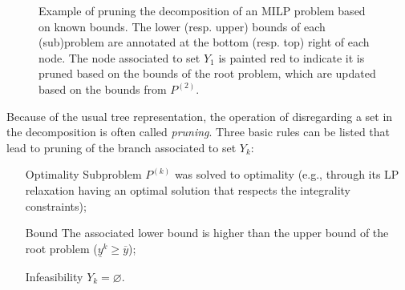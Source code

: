 \begin{figure}[h]
    \centering
    \caption{Example of pruning the decomposition of an MILP problem based on known bounds. The lower (resp. upper) bounds of each (sub)problem are annotated at the bottom (resp. top) right of each node. The node associated to set $Y_1$ is painted red to indicate it is pruned based on the bounds of the root problem, which are updated based on the bounds from $P^{(2)}$.}
    \label{fig:pruning-example-milp}
\end{figure}

Because of the usual tree representation, the operation of disregarding a set in the decomposition is often called \emph{pruning}.
Three basic rules can be listed that lead to pruning of the branch associated to set $Y_k$:
\begin{itemize}
    \item[Optimality] Subproblem $P^{(k)}$ was solved to optimality (e.g., through its LP relaxation having an optimal solution that respects the integrality constraints);
    \item[Bound] The associated lower bound is higher than the upper bound of the root problem ($\underline{y}^{k}\ge \overline{y}$);
    \item[Infeasibility] $Y_k = \varnothing$.
\end{itemize}


